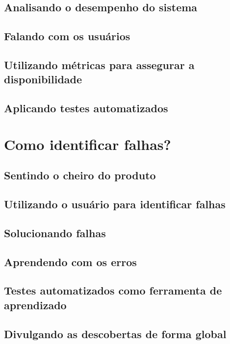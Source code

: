     \subsection{Analisando o desempenho do sistema}
    \subsection{Falando com os usuários}
    \subsection{Utilizando métricas para assegurar a disponibilidade}
    \subsection{Aplicando testes automatizados}

  \section{Como identificar falhas?}
    \subsection{Sentindo o cheiro do produto}
    \subsection{Utilizando o usuário para identificar falhas}
    \subsection{Solucionando falhas}
    \subsection{Aprendendo com os erros}
    \subsection{Testes automatizados como ferramenta de aprendizado}
    \subsection{Divulgando as descobertas de forma global}
